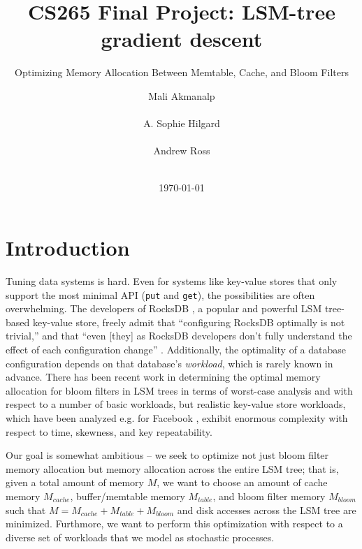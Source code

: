 \documentclass{sig-alternate-05-2015}
\begin{document}
\title{CS265 Final Project: LSM-tree gradient descent}
\subtitle{Optimizing Memory Allocation Between Memtable, Cache, and Bloom Filters}
\author{
\alignauthor
Mali Akmanalp\\
       \\
\alignauthor
A. Sophie Hilgard\\
       \\
\alignauthor Andrew Ross\\
       \\
       }

\date{\today}

\maketitle

\section{Introduction}

Tuning data systems is hard. Even for systems like key-value stores that only
support the most minimal API (\texttt{put} and \texttt{get}), the possibilities
are often overwhelming. The developers of RocksDB \cite{facebook:rocksdb}, a
popular and powerful LSM tree-based key-value store, freely admit that
``configuring RocksDB optimally is not trivial,'' and that ``even [they] as
RocksDB developers don't fully understand the effect of each configuration
change'' \cite{rocksdb-tuning-guide}. Additionally, the optimality of a
database configuration depends on that database's \textit{workload}, which is
rarely known in advance.  There has been recent work \cite{monkey} in
determining the optimal memory allocation for bloom filters in LSM trees in
terms of worst-case analysis and with respect to a number of basic workloads,
but realistic key-value store workloads, which have been analyzed e.g. for
Facebook \cite{characterizing-memcached}, exhibit enormous complexity with
respect to time, skewness, and key repeatability.

Our goal is somewhat ambitious -- we seek to optimize not just bloom filter
memory allocation but memory allocation across the entire LSM tree; that is,
given a total amount of memory $M$, we want to choose an amount of cache memory
$M_{cache}$, buffer/memtable memory $M_{table}$, and bloom filter memory
$M_{bloom}$ such that $M=M_{cache}+M_{table}+M_{bloom}$ and disk accesses
across the LSM tree are minimized. Furthmore, we want to perform this
optimization with respect to a diverse set of workloads that we model as
stochastic processes.
\end{document}
